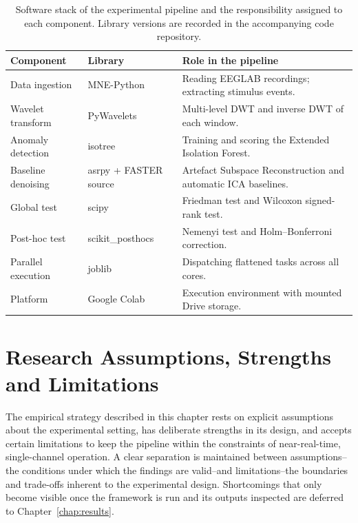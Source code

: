 \documentclass[MScCS,12pt,oneside,final]{uccthesis}
\begin{document}
\begin{table}[!htb]
    \centering
    \begin{tabularx}{\textwidth}{@{} l l X @{}}
        \toprule
        \textbf{Component} & \textbf{Library} & \textbf{Role in the pipeline} \\
        \midrule
        Data ingestion & MNE-Python & Reading EEGLAB recordings; extracting stimulus events. \\
        Wavelet transform & PyWavelets & Multi-level DWT and inverse DWT of each window. \\
        Anomaly detection & isotree & Training and scoring the Extended Isolation Forest. \\
        Baseline denoising & asrpy + FASTER source & Artefact Subspace Reconstruction and automatic ICA baselines. \\
        Global test & scipy & Friedman test and Wilcoxon signed-rank test. \\
        Post-hoc test & scikit\_posthocs & Nemenyi test and Holm--Bonferroni correction. \\
        Parallel execution & joblib & Dispatching flattened tasks across all cores. \\
        Platform & Google Colab & Execution environment with mounted Drive storage. \\
        \bottomrule
    \end{tabularx}
    \caption{Software stack of the experimental pipeline and the responsibility assigned to each
    component. Library versions are recorded in the accompanying code repository.}
    \label{tab:software_stack}
\end{table}

\section{Research Assumptions, Strengths and Limitations}
\label{sec:assumptions_strengths_limitations}

The empirical strategy described in this chapter rests on explicit assumptions about the experimental setting, has deliberate strengths in its design, and accepts certain limitations to keep the pipeline within the constraints of near-real-time, single-channel operation. A clear separation is maintained between assumptions--the conditions under which the findings are valid--and limitations--the boundaries and trade-offs inherent to the experimental design. Shortcomings that only become visible once the framework is run and its outputs inspected are deferred to Chapter~\ref{chap:results}.
\end{document}
